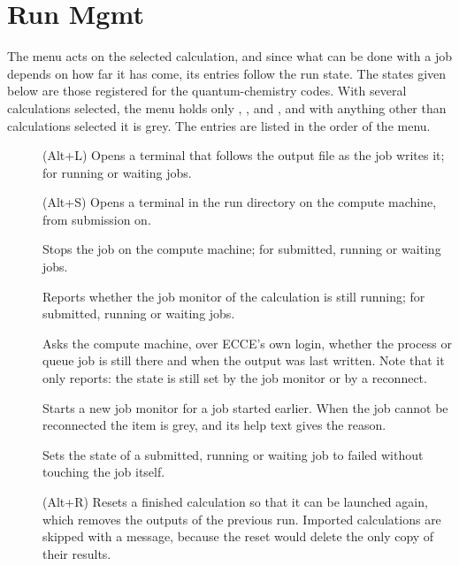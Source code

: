 \section{Run Mgmt}
The  menu acts on the selected calculation, and since what can be done with a job depends on how far it has come, its entries follow the run state. The states given below are those registered for the quantum-chemistry codes. With several calculations selected, the menu holds only , ,  and , and with anything other than calculations selected it is grey. The entries are listed in the order of the menu.
\begin{description}
	\item[] (\textsf{Alt+L}) Opens a terminal that follows the output file as the job writes it; for running or waiting jobs.
	\item[] (\textsf{Alt+S}) Opens a terminal in the run directory on the compute machine, from submission on.
	\item[] Stops the job on the compute machine; for submitted, running or waiting jobs.
	\item[] Reports whether the job monitor of the calculation is still running; for submitted, running or waiting jobs.
	\item[] Asks the compute machine, over ECCE's own login, whether the process or queue job is still there and when the output was last written. Note that it only reports: the state is still set by the job monitor or by a reconnect.
	\item[] Starts a new job monitor for a job started earlier. When the job cannot be reconnected the item is grey, and its help text gives the reason.
	\item[] Sets the state of a submitted, running or waiting job to failed without touching the job itself.
	\item[] (\textsf{Alt+R}) Resets a finished calculation so that it can be launched again, which removes the outputs of the previous run. Imported calculations are skipped with a message, because the reset would delete the only copy of their results.

\end{description}
